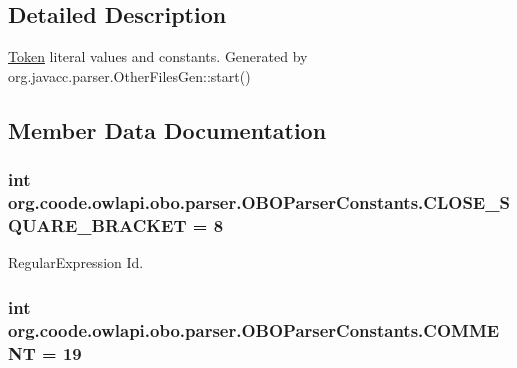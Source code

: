 \subsection{Detailed Description}
\hyperlink{classorg_1_1coode_1_1owlapi_1_1obo_1_1parser_1_1_token}{Token} literal values and constants. Generated by org.\-javacc.\-parser.\-Other\-Files\-Gen\-::start() 

\subsection{Member Data Documentation}
\hypertarget{interfaceorg_1_1coode_1_1owlapi_1_1obo_1_1parser_1_1_o_b_o_parser_constants_a63b9567bd9572d6a1fb7b95087c3f97e}{
\subsubsection[{C\-L\-O\-S\-E\-\_\-\-S\-Q\-U\-A\-R\-E\-\_\-\-B\-R\-A\-C\-K\-E\-T}]{\setlength{\rightskip}{0pt plus 5cm}int org.\-coode.\-owlapi.\-obo.\-parser.\-O\-B\-O\-Parser\-Constants.\-C\-L\-O\-S\-E\-\_\-\-S\-Q\-U\-A\-R\-E\-\_\-\-B\-R\-A\-C\-K\-E\-T = 8}}\label{interfaceorg_1_1coode_1_1owlapi_1_1obo_1_1parser_1_1_o_b_o_parser_constants_a63b9567bd9572d6a1fb7b95087c3f97e}
Regular\-Expression Id. \hypertarget{interfaceorg_1_1coode_1_1owlapi_1_1obo_1_1parser_1_1_o_b_o_parser_constants_a81dd55df9fc716f39fc57c5ec216cb06}{
\subsubsection[{C\-O\-M\-M\-E\-N\-T}]{\setlength{\rightskip}{0pt plus 5cm}int org.\-coode.\-owlapi.\-obo.\-parser.\-O\-B\-O\-Parser\-Constants.\-C\-O\-M\-M\-E\-N\-T = 19}}\label{interfaceorg_1_1coode_1_1owlapi_1_1obo_1_1parser_1_1_o_b_o_parser_constants_a81dd55df9fc716f39fc57c5ec216cb06}
